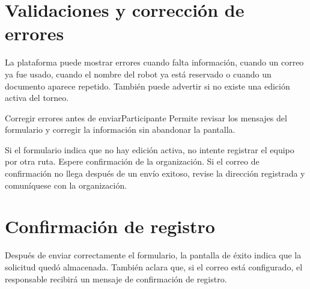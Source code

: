 \section{Validaciones y corrección de errores}

La plataforma puede mostrar errores cuando falta información, cuando un correo ya fue usado, cuando el nombre del robot ya está reservado o cuando un documento aparece repetido. También puede advertir si no existe una edición activa del torneo.


\begin{procedimiento}{Corregir errores antes de enviar}{Participante}
Permite revisar los mensajes del formulario y corregir la información sin abandonar la pantalla.
\end{procedimiento}


\begin{fallas}
Si el formulario indica que no hay edición activa, no intente registrar el equipo por otra ruta. Espere confirmación de la organización. Si el correo de confirmación no llega después de un envío exitoso, revise la dirección registrada y comuníquese con la organización.
\end{fallas}

\section{Confirmación de registro}

Después de enviar correctamente el formulario, la pantalla de éxito indica que la solicitud quedó almacenada. También aclara que, si el correo está configurado, el responsable recibirá un mensaje de confirmación de registro.


